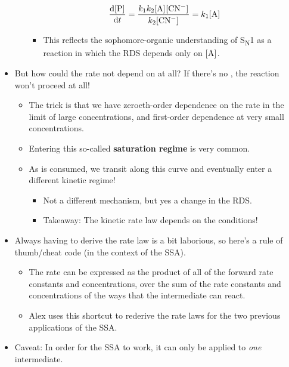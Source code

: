 \documentclass[../notes.tex]{subfiles}
\begin{document}
\begin{itemize}
\begin{itemize}
        \begin{equation*}
            \dv{\cnc{P}}{t} = \frac{k_1k_2\cnc{A}\cnc{CN-}}{k_2\cnc{CN-}}
            = k_1\cnc{A}
        \end{equation*}
        \begin{itemize}
            \item This reflects the sophomore-organic understanding of S\textsubscript{N}1 as a reaction in which the RDS depends only on $\cnc{A}$.
        \end{itemize}
    \end{itemize}
    \pagebreak
    \item But how could the rate not depend on  at all? If there's no , the reaction won't proceed at all!
    \begin{itemize}
        \item The trick is that we have zeroeth-order dependence on the rate in the limit of large  concentrations, and first-order dependence at very small  concentrations.
        \item Entering this so-called \textbf{saturation regime} is very common.
        \item As  is consumed, we transit along this curve and eventually enter a different kinetic regime!
        \begin{itemize}
            \item Not a different mechanism, but yes a change in the RDS.
            \item Takeaway: The kinetic rate law depends on the conditions!
        \end{itemize}
    \end{itemize}
    \item Always having to derive the rate law is a bit laborious, so here's a rule of thumb/cheat code (in the context of the SSA).
    \begin{itemize}
        \item The rate can be expressed as the product of all of the forward rate constants and concentrations, over the sum of the rate constants and concentrations of the ways that the intermediate can react.
        \item Alex uses this shortcut to rederive the rate laws for the two previous applications of the SSA.
    \end{itemize}
    \item Caveat: In order for the SSA to work, it can only be applied to \emph{one} intermediate.
    \begin{itemize}

\end{itemize}
\end{itemize}
\end{document}
